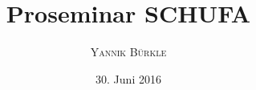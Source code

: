 \documentclass[12pt,titlepage]{article}
\begin{document}
\setcounter{page}{1}

\begin{titlepage}
\title{Proseminar SCHUFA}
\author{\textsc{Yannik Bürkle}}
\date{30. Juni 2016}
\end{titlepage}

\maketitle

\tableofcontents
\newpage
\setcounter{page}{1}
\end{document}
